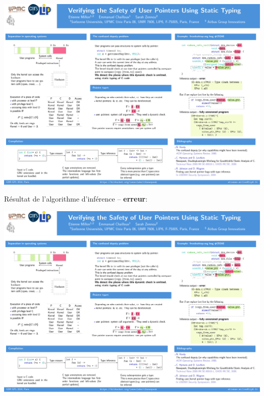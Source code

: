 \documentclass{beamer}
\def\codeout#1{
    \begin{center}
    \fboxsep=2mm
    \colorbox{codeoutcol}{\BUseVerbatim{#1}}
    \end{center}
}
\begin{document}
\begin{frame}
    \includegraphics[trim=2300 1430 100 500,clip,width=\textwidth]{poster.pdf}
\end{frame}

\begin{frame}[fragile]

Résultat de l'algorithme d'inférence -- \textbf{erreur}:

\codeout{drmko}
\end{frame}

\begin{frame}
    \includegraphics[trim=2300 990 100 1220,clip,width=\textwidth]{poster.pdf}
\end{frame}
\end{document}
